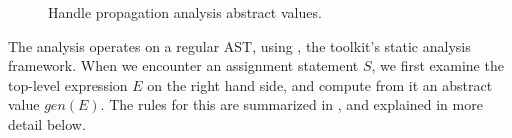 \begin{figure}
\centering
{}
\caption{Handle propagation analysis abstract values.}
\label{fig:HandleLattice}
\end{figure}


The analysis operates on a regular \matlab AST, using \mcsaf, the \mclab
toolkit's static analysis framework. When we encounter an assignment statement
$S$, we first examine the top-level expression $E$ on the right hand side, and
compute from it an abstract value $gen(E)$. The rules for this are summarized in
, and explained in more detail below.

